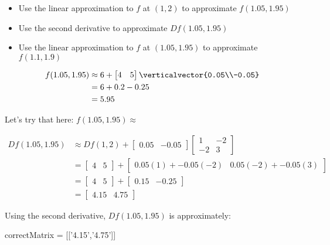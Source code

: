 \documentclass{ximera}
\begin{document}
\begin{question}
  \begin{itemize}
  \item Use the linear approximation to $f$ at $(1,2)$ to approximate $f(1.05,1.95)$
  \item Use the second derivative to approximate $Df(1.05,1.95)$
  \item Use the linear approximation to $f$ at $(1.05,1.95)$ to approximate $f(1.1,1.9)$
  \end{itemize}
  
  \begin{solution}
    \begin{hint}
      \begin{align*}
        f(1.05,1.95) &\approx 6+\begin{bmatrix} 4 & 5 \end{bmatrix} \verticalvector{0.05\\-0.05}\\
        &=6+0.2-0.25\\
        &=5.95
      \end{align*}
    \end{hint}
    Let's try that here:  $f(1.05,1.95) \approx$ 
  \end{solution}

  \begin{solution}
    \begin{hint}
      \begin{align*}
        Df(1.05,1.95) &\approx Df(1,2)+\begin{bmatrix} 0.05 & -0.05\end{bmatrix}\begin{bmatrix} 1 & -2 \\ -2 & 3\end{bmatrix}\\
        &= \begin{bmatrix} 4 & 5 \end{bmatrix} + \begin{bmatrix} 0.05(1)+-0.05(-2) & 0.05(-2)+-0.05(3)\end{bmatrix}\\
        &=\begin{bmatrix} 4 & 5 \end{bmatrix} + \begin{bmatrix} 0.15 & -0.25\end{bmatrix}\\
        &=\begin{bmatrix} 4.15 & 4.75\end{bmatrix}
      \end{align*}
    \end{hint}
    Using the second derivative, $Df(1.05,1.95) $ is approximately:
    \begin{matrix-answer}
      correctMatrix = [['4.15','4.75']]
    \end{matrix-answer}
  \end{solution}


\end{question}
\end{document}
